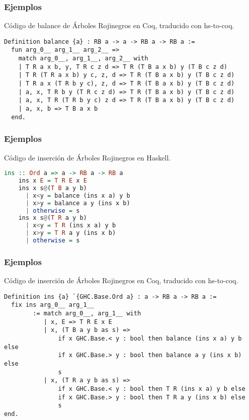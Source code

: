 \documentclass[xcolor=dvipsnames,table,handout]{beamer}
\begin{document}
\begin{frame}[fragile]
  \frametitle{Ejemplos}
  Código de balance de Árboles Rojinegros en Coq, traducido con hs-to-coq.
       \begin{lstlisting}[language=Coq]
 Definition balance {a} : RB a -> a -> RB a -> RB a :=
  fun arg_0__ arg_1__ arg_2__ =>
    match arg_0__, arg_1__, arg_2__ with
    | T R a x b, y, T R c z d => T R (T B a x b) y (T B c z d)
    | T R (T R a x b) y c, z, d => T R (T B a x b) y (T B c z d)
    | T R a x (T R b y c), z, d => T R (T B a x b) y (T B c z d)
    | a, x, T R b y (T R c z d) => T R (T B a x b) y (T B c z d)
    | a, x, T R (T R b y c) z d => T R (T B a x b) y (T B c z d)
    | a, x, b => T B a x b
  end.
       \end{lstlisting}
\end{frame}


\begin{frame}[fragile]
  \frametitle{Ejemplos}
  Código de inserción de Árboles Rojinegros en Haskell.
       \begin{lstlisting}[language=haskell]
    ins :: Ord a => a -> RB a -> RB a
    ins x E = T R E x E
    ins x s@(T B a y b)
      | x<y = balance (ins x a) y b
      | x>y = balance a y (ins x b)
      | otherwise = s
    ins x s@(T R a y b)
      | x<y = T R (ins x a) y b
      | x>y = T R a y (ins x b)
      | otherwise = s
       \end{lstlisting}
\end{frame}

\begin{frame}[fragile]
  \frametitle{Ejemplos}
  Código de inserción de Árboles Rojinegros en Coq, traducido con hs-to-coq.
       \begin{lstlisting}[language=Coq]
Definition ins {a} `{GHC.Base.Ord a} : a -> RB a -> RB a :=
  fix ins arg_0__ arg_1__
        := match arg_0__, arg_1__ with
           | x, E => T R E x E
           | x, (T B a y b as s) =>
               if x GHC.Base.< y : bool then balance (ins x a) y b else
               if x GHC.Base.> y : bool then balance a y (ins x b) else
               s
           | x, (T R a y b as s) =>
               if x GHC.Base.< y : bool then T R (ins x a) y b else
               if x GHC.Base.> y : bool then T R a y (ins x b) else
               s
end.
       \end{lstlisting}
\end{frame}
\end{document}

